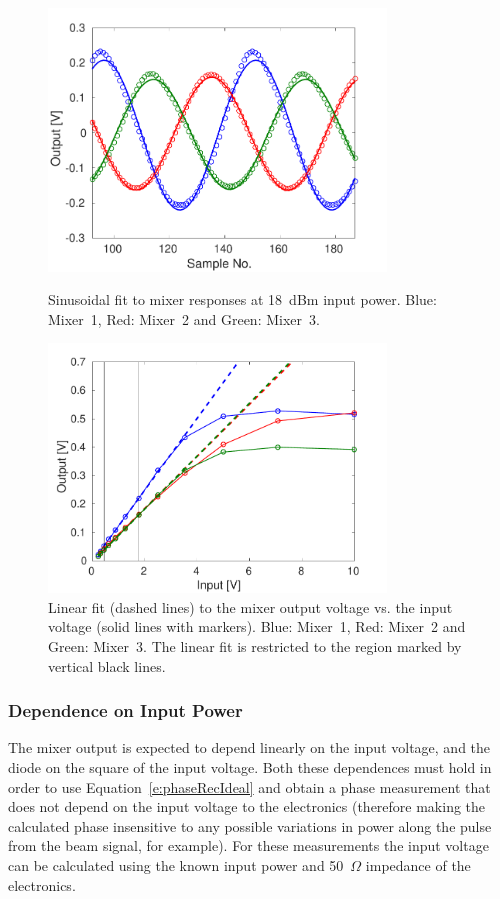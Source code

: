 \begin{figure}
  \centering
  \includegraphics[width=0.8\textwidth]{Figures/phaseMons/mixersFit18dBm}
  \caption{Sinusoidal fit to mixer responses at 18~dBm input power. Blue: Mixer~1, Red: Mixer~2 and Green: Mixer~3.}
  \label{f:mixersFit18dBm}
  \includegraphics[width=0.8\textwidth]{Figures/phaseMons/LinFitMixerVsVolts}
  \caption{Linear fit (dashed lines) to the mixer output voltage vs.  the input voltage (solid lines with markers). Blue: Mixer~1, Red: Mixer~2 and Green: Mixer~3. The linear fit is restricted to the region marked by vertical black lines.}
  \label{f:LinFitMixerVsVolts}
\end{figure}

\subsubsection{Dependence on Input Power}

The mixer output is expected to depend linearly on the input voltage, and the diode on the square of the input voltage. Both these dependences must hold in order to use Equation~\ref{e:phaseRecIdeal} and obtain a phase measurement that does not depend on the input voltage to the electronics (therefore making the calculated phase insensitive to any possible variations in power along the pulse from the beam signal, for example). For these measurements the input voltage can be calculated using the known input power and 50~\(\Omega\) impedance of the electronics.

